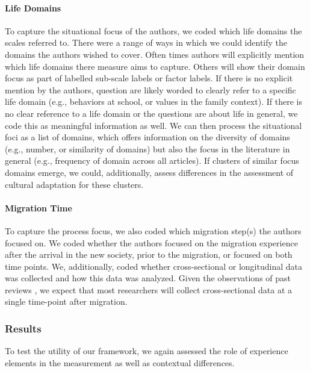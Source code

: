 \documentclass[man, 12pt, a4paper]{apa7}
\begin{document}
\paragraph{Life Domains}
To capture the situational focus of the authors, we coded which life domains the scales referred to. There were a range of ways in which we could identify the domains the authors wished to cover. Often times authors will explicitly mention which life domains there measure aims to capture. Others will show their domain focus as part of labelled sub-scale labels or factor labels. If there is no explicit mention by the authors, question are likely worded to clearly refer to a specific life domain (e.g., behaviors at school, or values in the family context). If there is no clear reference to a life domain or the questions are about life in general, we code this as meaningful information as well. We can then process the situational foci as a list of domains, which offers information on the diversity of domains (e.g., number, or similarity of domains) but also the focus in the literature in general (e.g., frequency of domain across all articles). If clusters of similar focus domains emerge, we could, additionally, assess differences in the assessment of cultural adaptation for these clusters.

\paragraph{Migration Time}
To capture the process focus, we also coded which migration step(s) the authors focused on. We coded whether the authors focused on the migration experience after the arrival in the new society, prior to the migration, or focused on both time points. We, additionally, coded whether cross-sectional or longitudinal data was collected and how this data was analyzed. Given the observations of past reviews \citep[e.g.,][]{Brown2011, Ward2019}, we expect that most researchers will collect cross-sectional data at a single time-point after migration.



\subsubsection{Results}
To test the utility of our framework, we again assessed the role of experience elements in the measurement as well as contextual differences.
\end{document}

